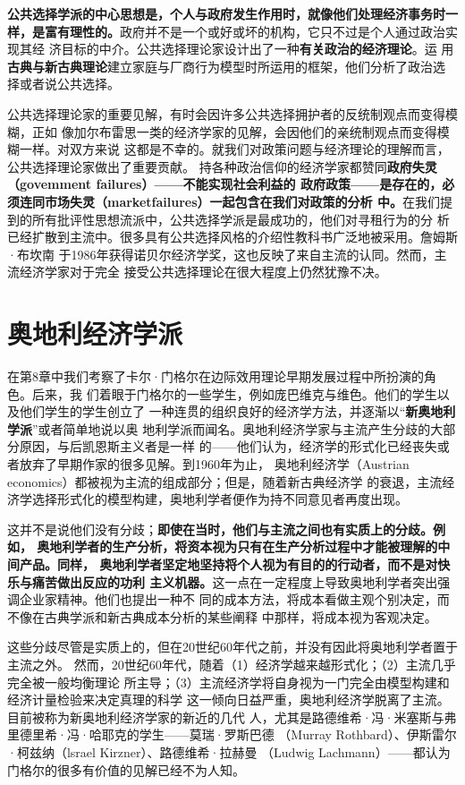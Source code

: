 \textbf{公共选择学派的中心思想是，个人与政府发生作用时，就像他们处理经济事务时一
  样，是富有理性的。}政府并不是一个或好或坏的机构，它只不过是个人通过政治实现其经
济目标的中介。公共选择理论家设计出了一种\textbf{有关政治的经济理论}。运
用\textbf{古典与新古典理论}建立家庭与厂商行为模型时所运用的框架，他们分析了政治选
择或者说公共选择。

公共选择理论家的重要见解，有时会因许多公共选择拥护者的反统制观点而变得模糊，正如
像加尔布雷思一类的经济学家的见解，会因他们的亲统制观点而变得模糊一样。对双方来说
这都是不幸的。就我们对政策问题与经济理论的理解而言，公共选择理论家做出了重要贡献。
持各种政治信仰的经济学家都赞同\textbf{政府失灵（govemment failures）——不能实现社会利益的
政府政策——是存在的，必须连同市场失灵（marketfailures）一起包含在我们对政策的分析
中。}在我们提到的所有批评性思想流派中，公共选择学派是最成功的，他们对寻租行为的分
析已经扩散到主流中。很多具有公共选择风格的介绍性教科书广泛地被采用。詹姆斯·布坎南
于1986年获得诺贝尔经济学奖，这也反映了来自主流的认同。然而，主流经济学家对于完全
接受公共选择理论在很大程度上仍然犹豫不决。


\section{奥地利经济学派}

在第8章中我们考察了卡尔·门格尔在边际效用理论早期发展过程中所扮演的角色。后来，我
们着眼于门格尔的一些学生，例如庞巴维克与维色。他们的学生以及他们学生的学生创立了
一种连贯的组织良好的经济学方法，并逐渐以“\textbf{新奥地利学派}”或者简单地说以奥
地利学派而闻名。奥地利经济学家与主流产生分歧的大部分原因，与后凯恩斯主义者是一样
的——他们认为，经济学的形式化已经丧失或者放弃了早期作家的很多见解。到1960年为止，
奥地利经济学（Austrian economics）都被视为主流的组成部分；但是，随着新古典经济学
的衰退，主流经济学选择形式化的模型构建，奥地利学者便作为持不同意见者再度出现。

这并不是说他们没有分歧；\textbf{即使在当时，他们与主流之间也有实质上的分歧。例如，
  奥地利学者的生产分析，将资本视为只有在生产分析过程中才能被理解的中间产品。同样，
  奥地利学者坚定地坚持将个人视为有目的的行动者，而不是对快乐与痛苦做出反应的功利
  主义机器。}这一点在一定程度上导致奥地利学者突出强调企业家精神。他们也提出一种不
同的成本方法，将成本看做主观个别决定，而不像在古典学派和新古典成本分析的某些阐释
中那样，将成本视为客观决定。

这些分歧尽管是实质上的，但在20世纪60年代之前，并没有因此将奥地利学者置于主流之外。
然而，20世纪60年代，随着（1）经济学越来越形式化；（2）主流几乎完全被一般均衡理论
所主导；（3）主流经济学将自身视为一门完全由模型构建和经济计量检验来决定真理的科学
这一倾向日益严重，奥地利经济学脱离了主流。目前被称为新奥地利经济学家的新近的几代
人，尤其是路德维希·冯·米塞斯与弗里德里希·冯·哈耶克的学生——莫瑞·罗斯巴德
（Murray Rothbard）、伊斯雷尔·柯兹纳（lsrael Kirzner）、路德维希·拉赫曼
（Ludwig Lachmann）——都认为门格尔的很多有价值的见解已经不为人知。


